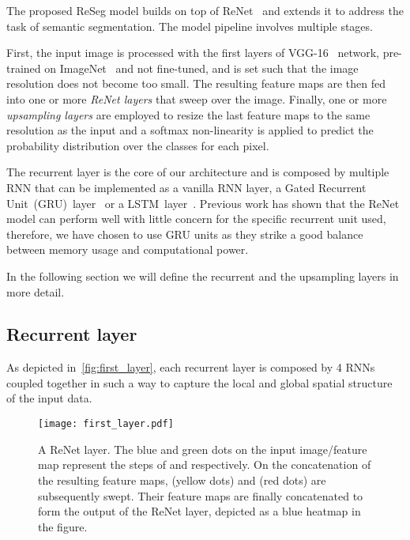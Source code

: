 \documentclass[times,art10,twocolumn,latex8]{article}
\begin{document}
The proposed ReSeg model builds on top of ReNet~\cite{visin2015renet} and
extends it to address the task of semantic segmentation. The model
pipeline involves multiple stages.

First, the input image is processed with the first layers of
VGG-16~\cite{Simonyan2015} network, pre-trained on
ImageNet~\cite{imagenet_cvpr09} and not fine-tuned, and is set such that the
image resolution does not become too small. The resulting feature maps are then
fed into one or more \emph{ReNet layers} that sweep over the image. Finally,
one or more \emph{upsampling layers} are employed to resize the last feature
maps to the same resolution as the input and a softmax non-linearity is applied
to predict the probability distribution over the classes for each pixel.

The recurrent layer is the core of our architecture and is composed by multiple
RNN that can be implemented as a vanilla  RNN layer, a Gated Recurrent
Unit~(GRU)~layer~\cite{Cho2014} or a
LSTM~layer~\cite{Hochreiter+Schmidhuber-1997}. Previous work has shown that
the ReNet model can perform well with little concern for the specific recurrent
unit used, therefore, we have chosen to use GRU units as they strike a good
balance between memory usage and computational power.

In the following section we will define the recurrent and the upsampling layers
in more detail.

\subsection{Recurrent layer}
As depicted in~\autoref{fig:first_layer}, each recurrent layer is composed
by 4 RNNs coupled together in such a way to capture the local and global
spatial structure of the input data.



\begin{figure}[t]
    \begin{center}
        \texttt{[image: first\_layer.pdf]}
        \caption{A ReNet layer. The blue and green dots on the input
            image/feature map represent the steps of  and
             respectively. On the concatenation of the resulting
            feature maps,  (yellow dots) and 
            (red dots) are subsequently swept. Their feature maps are finally
            concatenated to form the output of the ReNet layer, depicted as a
            blue heatmap in the figure.}
        \label{fig:first_layer}
        \vspace{-5mm}
    \end{center}
\end{figure}
\end{document}
